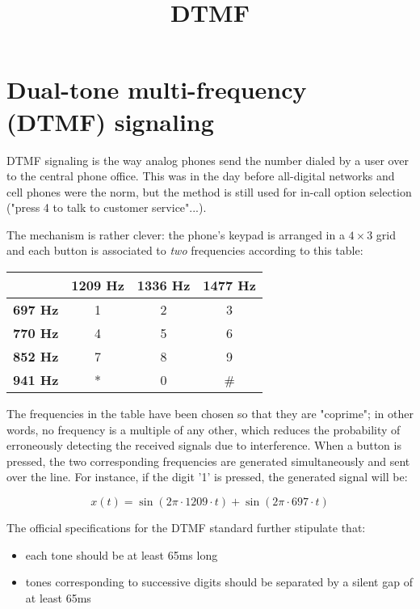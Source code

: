 \documentclass[11pt]{article}
\title{DTMF}
\providecommand{\tightlist}{%
      \setlength{\itemsep}{0pt}\setlength{\parskip}{0pt}}
\begin{document}
    
    
    \maketitle
    
    

    
    \section{Dual-tone multi-frequency (DTMF)
signaling}\label{dual-tone-multi-frequency-dtmf-signaling}

DTMF signaling is the way analog phones send the number dialed by a user
over to the central phone office. This was in the day before all-digital
networks and cell phones were the norm, but the method is still used for
in-call option selection ("press 4 to talk to customer service"...).

The mechanism is rather clever: the phone's keypad is arranged in a
\(4\times 3\) grid and each button is associated to \emph{two}
frequencies according to this table:

\begin{longtable}[]{@{}lccc@{}}
\toprule
& \textbf{1209 Hz} & \textbf{1336 Hz} & \textbf{1477 Hz}\tabularnewline
\midrule
\endhead
\textbf{697 Hz} & 1 & 2 & 3\tabularnewline
\textbf{770 Hz} & 4 & 5 & 6\tabularnewline
\textbf{852 Hz} & 7 & 8 & 9\tabularnewline
\textbf{941 Hz} & * & 0 & \#\tabularnewline
\bottomrule
\end{longtable}

The frequencies in the table have been chosen so that they are
"coprime"; in other words, no frequency is a multiple of any other,
which reduces the probability of erroneously detecting the received
signals due to interference. When a button is pressed, the two
corresponding frequencies are generated simultaneously and sent over the
line. For instance, if the digit '1' is pressed, the generated signal
will be:

\[
    x(t) = \sin(2\pi\cdot 1209\cdot t) + \sin(2\pi\cdot697\cdot t)
\]

The official specifications for the DTMF standard further stipulate
that:

\begin{itemize}
\tightlist
\item
  each tone should be at least 65ms long
\item
  tones corresponding to successive digits should be separated by a
  silent gap of at least 65ms
\end{itemize}
\end{document}
